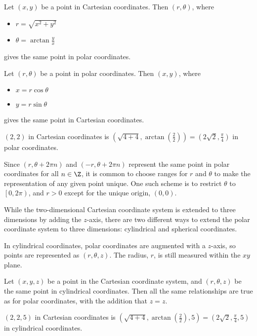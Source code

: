\documentclass[12pt]{article}
\begin{document}
\begin{thm}
    Let $(x, y)$ be a point in Cartesian coordinates. Then $(r, \theta)$, where
    \begin{itemize}
        \item $r = \sqrt{x^2 + y^2}$
        \item $\theta = \arctan\frac{y}{x}$
    \end{itemize} gives the same point in polar coordinates.
\end{thm}

\begin{thm}
    Let $(r, \theta)$ be a point in polar coordinates. Then $(x, y)$, where
    \begin{itemize}
        \item $x = r\cos\theta$
        \item $y = r\sin\theta$
    \end{itemize} gives the same point in Cartesian coordinates.
\end{thm}

\begin{exmp}
    $(2, 2)$ in Cartesian coordinates is $(\sqrt{4 + 4}, \arctan(\frac{2}{2})) = (2\sqrt{2}, \frac{\pi}{4})$ in polar coordinates.
\end{exmp}

Since $(r, \theta + 2\pi{n})$ and $(-r, \theta + 2\pi{n})$ represent the same point in polar coordinates for all $n \in \Z$, it is common to choose ranges for $r$ and $\theta$ to make the representation of any given point unique. One such scheme is to restrict $\theta$ to $\left[0, 2\pi\right)$, and $r > 0$ except for the unique origin, $(0, 0)$.

While the two-dimensional Cartesian coordinate system is extended to three dimensions by adding the $z$-axis, there are two different ways to extend the polar coordinate system to three dimensions: cylindrical and spherical coordinates.

In cylindrical coordinates, polar coordinates are augmented with a $z$-axis, so points are represented as $(r, \theta, z)$. The radius, $r$, is still measured within the $xy$ plane.

Let $(x, y, z)$ be a point in the Cartesian coordinate system, and $(r, \theta, z)$ be the same point in cylindrical coordinates. Then all the same relationships are true as for polar coordinates, with the addition that $z = z$.

\begin{exmp}
    $(2, 2, 5)$ in Cartesian coordinates is $(\sqrt{4 + 4}, \arctan(\frac{2}{2}), 5) = (2\sqrt{2}, \frac{\pi}{4}, 5)$ in cylindrical coordinates.
\end{exmp}
\end{document}
